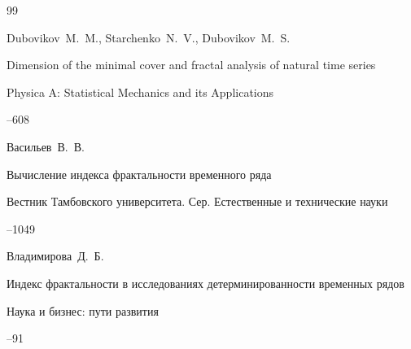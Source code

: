 \begin{thebibliography}{99}

\by Dubovikov~M.~M., Starchenko~N.~V., Dubovikov~M.~S.

\paper Dimension of the minimal cover and fractal analysis of natural time series 

\jour Physica A: Statistical Mechanics and its Applications




--608







\by Васильев~В.~В.

\paper Вычисление индекса фрактальности временного ряда 

\jour Вестник Тамбовского университета. Сер. Естественные и технические науки




--1049














\by Владимирова~Д.~Б.

\paper Индекс фрактальности в исследованиях детерминированности временных рядов 

\jour Наука и бизнес: пути развития 



--91



\end{thebibliography}
